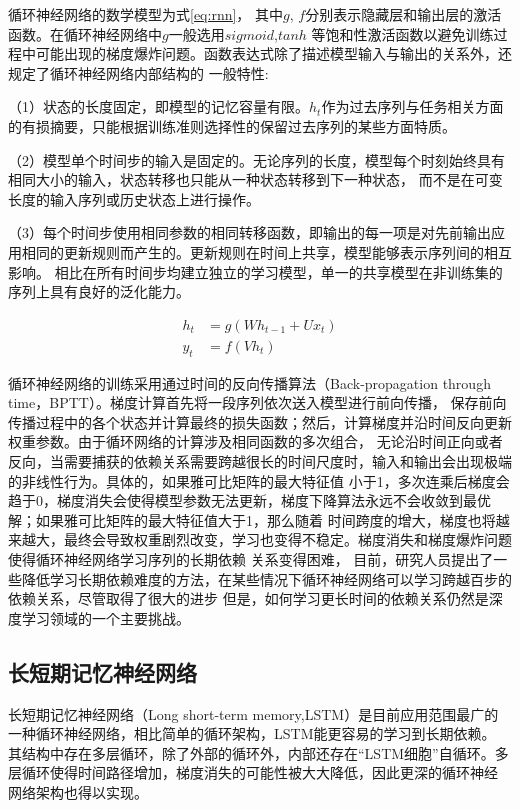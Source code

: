 循环神经网络的数学模型为式\ref{eq:rnn}， 其中\(g\), \(f\)分别表示隐藏层和输出层的激活函数。在循环神经网络中\(g\)一般选用\(sigmoid\),\(tanh\)
等饱和性激活函数以避免训练过程中可能出现的梯度爆炸问题。函数表达式除了描述模型输入与输出的关系外，还规定了循环神经网络内部结构的
一般特性:

（1）状态的长度固定，即模型的记忆容量有限。\(h_t\)作为过去序列与任务相关方面的有损摘要，只能根据训练准则选择性的保留过去序列的某些方面特质。

（2）模型单个时间步的输入是固定的。无论序列的长度，模型每个时刻始终具有相同大小的输入，状态转移也只能从一种状态转移到下一种状态，
而不是在可变长度的输入序列或历史状态上进行操作。

（3）每个时间步使用相同参数的相同转移函数，即输出的每一项是对先前输出应用相同的更新规则而产生的。更新规则在时间上共享，模型能够表示序列间的相互影响。
相比在所有时间步均建立独立的学习模型，单一的共享模型在非训练集的序列上具有良好的泛化能力。

\begin{equation}\label{eq:rnn}
	\begin{split}
		h_{t} &= g(W h_{t-1} + U x_{t})	\\
		y_{t} &= f(V h_{t})						
	\end{split}
\end{equation}

循环神经网络的训练采用通过时间的反向传播算法（Back-propagation through time，BPTT）。梯度计算首先将一段序列依次送入模型进行前向传播，
保存前向传播过程中的各个状态并计算最终的损失函数；然后，计算梯度并沿时间反向更新权重参数。由于循环网络的计算涉及相同函数的多次组合，
无论沿时间正向或者反向，当需要捕获的依赖关系需要跨越很长的时间尺度时，输入和输出会出现极端的非线性行为。具体的，如果雅可比矩阵的最大特征值
小于1，多次连乘后梯度会趋于0，梯度消失会使得模型参数无法更新，梯度下降算法永远不会收敛到最优解；如果雅可比矩阵的最大特征值大于1，那么随着
时间跨度的增大，梯度也将越来越大，最终会导致权重剧烈改变，学习也变得不稳定。梯度消失和梯度爆炸问题使得循环神经网络学习序列的长期依赖
关系变得困难， 目前，研究人员提出了一些降低学习长期依赖难度的方法，在某些情况下循环神经网络可以学习跨越百步的依赖关系，尽管取得了很大的进步
但是，如何学习更长时间的依赖关系仍然是深度学习领域的一个主要挑战。


\subsection{长短期记忆神经网络}
长短期记忆神经网络（Long short-term memory,LSTM）是目前应用范围最广的一种循环神经网络，相比简单的循环架构，LSTM能更容易的学习到长期依赖。
其结构中存在多层循环，除了外部的循环外，内部还存在“LSTM细胞”自循环。多层循环使得时间路径增加，梯度消失的可能性被大大降低，因此更深的循环神经
网络架构也得以实现\citing{}。

